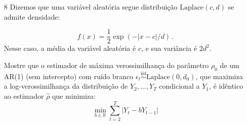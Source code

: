 \documentclass[10pt,a4paper]{article}
\begin{document}
\begin{enumerate}
		\item[8] Dizemos que uma variável aleatória segue distribuição $\text{Laplace}(c,d)$ se admite densidade:

	$$f(x) = \frac{1}{2}\exp(-|x-c|/d) \, .$$
	Nesse caso, a média da variável aleatória é $c$, e sua variância é $2d^2$.

	 Mostre que o estimador de máxima verossimilhança do parâmetro $\rho_0$ de um AR(1) (sem intercepto) com ruído branco $\epsilon_t \overset{\text{iid}}{\sim}\text{Laplace}(0,d_0)$, que maximiza a log-verossimilhança da distribuição de $Y_2,\ldots, Y_T$ condicional a $Y_1$, é idêntico ao estimador $\hat \rho$ que minimiza:
	$$\min_{b \in \mathbb{R}}\sum_{t=2}^T |Y_t - b Y_{t-1}|$$
	
	
		
	

\end{enumerate}
\end{document}
